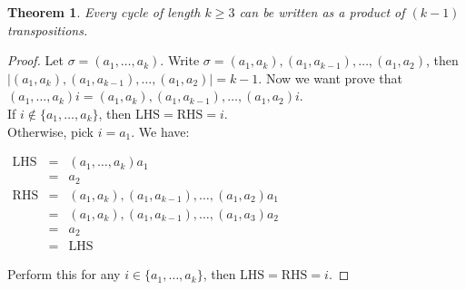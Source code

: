\documentclass{article}
\theoremstyle{MyNonumberplain}
\theoremstyle{break}
\newtheorem*{proof}{Proof. }
\newcommand{\nin}{\not\in}
\newcommand{\tmop}{\text}
\theoremstyle{break}
\newtheorem{theorem}{Theorem}[section]
\theoremstyle{break}
\theoremstyle{definition}
\theoremstyle{break}
\begin{document}
\begin{thmbox}
    \begin{theorem}
        Every cycle of length $k\geq3$ can be written as a product of $(k-1)$ transpositions.
    \end{theorem}
    \begin{prfbox}
        \begin{proof}
            Let $\sigma = (a_1, \ldots, a_k)$. Write $\sigma = (a_1, a_k), (a_1,
            a_{k - 1}), \ldots, (a_1, a_2)$, then $| (a_1, a_k), (a_1, a_{k - 1}), \ldots, (a_1, a_2) | = k - 1$. Now we want prove that $(a_1, \ldots, a_k) i = (a_1, a_k), (a_1, a_{k - 1}), \ldots, (a_1, a_2) i$.\\

            If $i \nin \{ a_1, \ldots, a_k \}$, then $\tmop{LHS} = \tmop{RHS} = i$.\\

            Otherwise, pick $i=a_1$. We have:\\

            \begin{center}
                $\begin{array}{lll}
                    \tmop{LHS} & = & (a_1, \ldots, a_k) a_1\\
                    & = & a_2\\
                    \tmop{RHS} & = & (a_1, a_k), (a_1, a_{k - 1}), \ldots, (a_1, a_2) a_1\\
                    & = & (a_1, a_k), (a_1, a_{k - 1}), \ldots, (a_1, a_3) a_2\\
                    & = & a_2\\
                    & = & \tmop{LHS}
                \end{array}$
            \end{center}
            Perform this for any $i \in \{ a_1, \ldots, a_k \}$, then $\tmop{LHS} = \tmop{RHS} = i$.
        \end{proof}
    \end{prfbox}
\end{thmbox}
\end{document}
